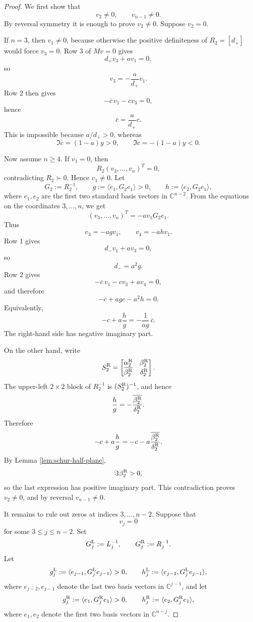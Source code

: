 \documentclass[11pt]{amsart}
\numberwithin{equation}{section}
\newcommand{\C}{\mathbb C}
\begin{document}
\begin{proof}
We first show that
\[
v_2\ne0,
\qquad
v_{n-1}\ne0.
\]
By reversal symmetry it is enough to prove \(v_2\ne0\).  Suppose \(v_2=0\).

If \(n=3\), then \(v_1\ne0\), because otherwise the positive definiteness of \(R_2=[d_+]\) would force \(v_3=0\).  Row \(3\) of \(Mv=0\) gives
\[
d_+v_3+av_1=0,
\]
so
\[
v_3=-\frac{a}{d_+}v_1.
\]
Row \(2\) then gives
\[
-\overline c\,v_1-cv_3=0,
\]
hence
\[
\overline c=\frac{a}{d_+}c.
\]
This is impossible because \(a/d_+>0\), whereas
\[
\Im\overline c=(1-a)y>0,
\qquad
\Im c=-(1-a)y<0.
\]

Now assume \(n\ge4\).  If \(v_1=0\), then
\[
R_2(v_3,\dots,v_n)^T=0,
\]
contradicting \(R_2\succ0\).  Hence \(v_1\ne0\).  Let
\[
G_2:=R_2^{-1},
\qquad
g:=\langle e_1,G_2e_1\rangle>0,
\qquad
h:=\langle e_2,G_2e_1\rangle,
\]
where \(e_1,e_2\) are the first two standard basis vectors in \(\C^{n-2}\).  From the equations on the coordinates \(3,\dots,n\), we get
\[
(v_3,\dots,v_n)^T=-av_1G_2e_1.
\]
Thus
\[
v_3=-agv_1,
\qquad
v_4=-ahv_1.
\]
Row \(1\) gives
\[
d_-v_1+av_3=0,
\]
so
\[
d_-=a^2g.
\]
Row \(2\) gives
\[
-\overline c\,v_1-cv_3+av_4=0,
\]
and therefore
\[
-\overline c+agc-a^2h=0.
\]
Equivalently,
\[
-c+a\frac{h}{g}
=
-\frac{1}{ag}\,\overline c.
\]
The right-hand side has negative imaginary part.

On the other hand, write
\[
S_2^{\rm R}
=
\begin{bmatrix}
\alpha_2^{\rm R} & \beta_2^{\rm R}\\
\overline{\beta_2^{\rm R}} & \delta_2^{\rm R}
\end{bmatrix}.
\]
The upper-left \(2\times2\) block of \(R_2^{-1}\) is \((S_2^{\rm R})^{-1}\), and hence
\[
\frac{h}{g}
=
-\frac{\overline{\beta_2^{\rm R}}}{\delta_2^{\rm R}}.
\]
Therefore
\[
-c+a\frac{h}{g}
=
-c-a\frac{\overline{\beta_2^{\rm R}}}{\delta_2^{\rm R}}.
\]
By Lemma \ref{lem:schur-half-plane},
\[
\Im\beta_2^{\rm R}>0,
\]
so the last expression has positive imaginary part.  This contradiction proves \(v_2\ne0\), and by reversal \(v_{n-1}\ne0\).

It remains to rule out zeros at indices \(3,\dots,n-2\).  Suppose that
\[
v_j=0
\]
for some \(3\le j\le n-2\).  Set
\[
G_j^{\rm L}:=L_j^{-1},
\qquad
G_j^{\rm R}:=R_j^{-1}.
\]
Let
\[
g_j^{\rm L}
:=
\langle e_{j-1},G_j^{\rm L}e_{j-1}\rangle>0,
\qquad
h_j^{\rm L}
:=
\langle e_{j-2},G_j^{\rm L}e_{j-1}\rangle,
\]
where \(e_{j-2},e_{j-1}\) denote the last two basis vectors in \(\C^{j-1}\), and let
\[
g_j^{\rm R}
:=
\langle e_1,G_j^{\rm R}e_1\rangle>0,
\qquad
h_j^{\rm R}
:=
\langle e_2,G_j^{\rm R}e_1\rangle,
\]
where \(e_1,e_2\) denote the first two basis vectors in \(\C^{n-j}\).


\end{proof}
\end{document}
